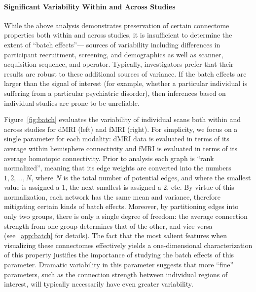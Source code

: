 \documentclass[11pt]{article}
\begin{document}
\begin{multicols}{2}




\paragraph{Significant Variability Within and Across Studies}

While the above analysis demonstrates preservation of certain connectome properties both within and across studies, it is insufficient to determine the extent of ``batch effects''--- sources of variability including differences in participant recruitment, screening, and demographics as well as scanner, acquisition sequence, and operator.  Typically, investigators prefer that their results are robust to these additional sources of variance.
 If the batch effects are larger than the signal of interest (for example, whether a particular individual is suffering from a particular psychiatric disorder), then inferences based on individual studies are prone to be unreliable.  
%

Figure~\ref{fig:batch} evaluates the variability of individual scans both within and across studies for dMRI (left) and fMRI (right). For simplicity, we focus on a single parameter for each modality:  dMRI data is evaluated in terms of its average within hemisphere connectivity and fMRI is evaluated in terms of its average homotopic connectivity. Prior to analysis each graph is ``rank normalized'', meaning that its edge weights are converted into the numbers $1,2,...,N$, where $N$ is the total number of potential edges, and where the smallest value is assigned a $1$, the next smallest is assigned a $2$, etc. By virtue of this normalization, each network has the same mean and variance, therefore mitigating certain kinds of batch effects. Moreover, by partitioning edges into only two groups, there is only a single degree of freedom: the average connection strength from one group determines that of the other, and vice versa (see~\ref{app:batch} for details).
The fact that the most salient features when visualizing these connectomes effectively yields a one-dimensional characterization of this property justifies the importance of studying the batch effects of this parameter.   
Dramatic variability in this parameter suggests that more ``fine'' parameters, such as the connection strength between individual regions of interest, will typically necessarily have even greater variability.


\end{multicols}
\end{document}

